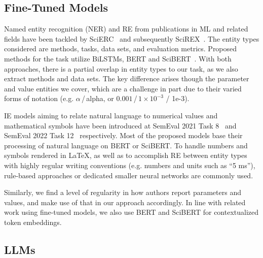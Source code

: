 

\subsection{Fine-Tuned Models}


Named entity recognition (NER) and RE from publications in ML and related fields have been tackled by SciERC~\cite{luan2018scierc} and subsequently SciREX~\cite{Jain2020scirex}. The entity types considered are methods, tasks, data sets, and evaluation metrics. Proposed methods for the task utilize BiLSTMs, BERT and SciBERT~\cite{Beltagy2019}. With both approaches, there is a partial overlap in entity types to our task, as we also extract methods and data sets. The key difference arises though the parameter and value entities we cover, which are a challenge in part due to their varied forms of notation (e.g. $\alpha$\,/\,alpha, or $0.001$\,/\,$1\times 10^{-3}$ / 1e-3).

IE models aiming to relate natural language to numerical values and mathematical symbols have been introduced at SemEval 2021 Task 8~\cite{semeval21_task8} and SemEval 2022 Task 12~\cite{semeval22_task12} respectively. Most of the proposed models base their processing of natural language on BERT or SciBERT. To handle numbers and symbols rendered in \LaTeX{}, as well as to accomplish RE between entity types with highly regular writing conventions (e.g. numbers and units such as ``5 ms''), rule-based approaches or dedicated smaller neural networks are commonly used.

Similarly, we find a level of regularity in how authors report parameters and values, and make use of that in our approach accordingly. In line with related work using fine-tuned models, we also use BERT and SciBERT for contextualized token embeddings.

\subsection{LLMs}

